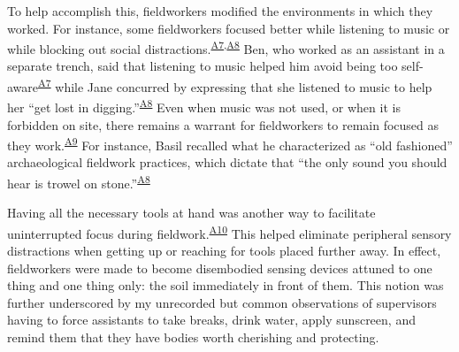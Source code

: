\documentclass{article}
\begin{document}
To help accomplish this, fieldworkers modified the environments in which
they worked. For instance, some fieldworkers focused better while
listening to music or while blocking out social
distractions.\textsuperscript{\hyperref[sec-A7]{A7},\hyperref[sec-A8]{A8}}
Ben, who worked as an assistant in a separate trench, said that
listening to music helped him avoid being too
self-aware\textsuperscript{\hyperref[sec-A7]{A7}} while Jane concurred
by expressing that she listened to music to help her ``get lost in
digging.''\textsuperscript{\hyperref[sec-A8]{A8}} Even when music was
not used, or when it is forbidden on site, there remains a warrant for
fieldworkers to remain focused as they
work.\textsuperscript{\hyperref[sec-A9]{A9}} For instance, Basil
recalled what he characterized as ``old fashioned'' archaeological
fieldwork practices, which dictate that ``the only sound you should hear
is trowel on stone.''\textsuperscript{\hyperref[sec-A8]{A8}}

Having all the necessary tools at hand was another way to facilitate
uninterrupted focus during
fieldwork.\textsuperscript{\hyperref[sec-A10]{A10}} This helped
eliminate peripheral sensory distractions when getting up or reaching
for tools placed further away. In effect, fieldworkers were made to
become disembodied sensing devices attuned to one thing and one thing
only: the soil immediately in front of them. This notion was further
underscored by my unrecorded but common observations of supervisors
having to force assistants to take breaks, drink water, apply sunscreen,
and remind them that they have bodies worth cherishing and protecting.
\end{document}

